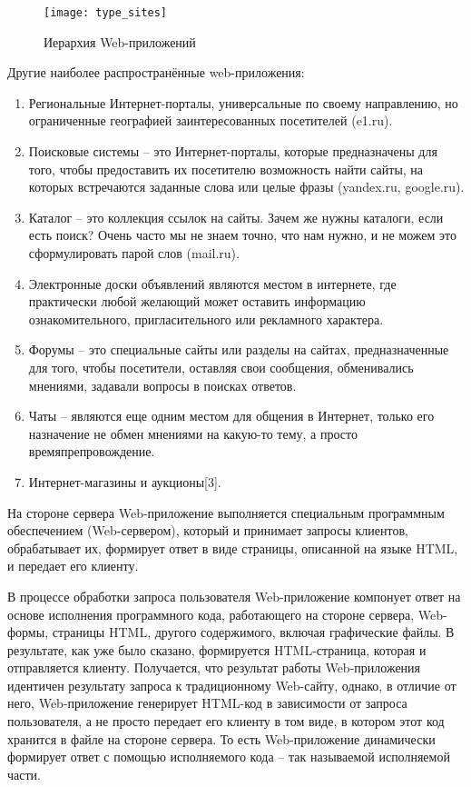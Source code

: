 \begin{figure}[h]
\center\texttt{[image: type\_sites]}
\caption{Иерархия Web-приложений}\label{type_sites}
\end{figure}

Другие наиболее распространённые web-приложения:
\begin{enumerate}
\item Региональные Интернет-порталы, универсальные по своему направлению, но ограниченные географией заинтересованных посетителей (e1.ru).
\item Поисковые системы -- это Интернет-порталы, которые предназначены для того, чтобы предоставить их посетителю возможность найти сайты, на которых встречаются заданные слова или целые фразы (yandex.ru, google.ru).
\item Каталог -- это коллекция ссылок на сайты. Зачем же нужны каталоги, если есть поиск? Очень часто мы не знаем точно, что нам нужно, и не можем это сформулировать парой слов (mail.ru).
\item Электронные доски объявлений  являются местом в интернете, где практически любой желающий может оставить информацию ознакомительного, пригласительного или рекламного характера.
\item Форумы -- это специальные сайты или разделы на сайтах, предназначенные для того, чтобы посетители, оставляя свои сообщения, обменивались мнениями, задавали вопросы в поисках ответов.
\item Чаты -- являются еще одним местом для общения в Интернет, только его назначение не обмен мнениями на какую-то тему, а просто времяпрепровождение.
\item Интернет-магазины и аукционы[3].
\end{enumerate}



На стороне сервера Web-приложение выполняется специальным программным обеспечением (Web-сервером), который и принимает запросы клиентов, обрабатывает их, формирует ответ в виде страницы, описанной на языке HTML, и передает его клиенту.

В процессе обработки запроса пользователя Web-приложение компонует ответ на основе исполнения программного кода, работающего на стороне сервера, Web-формы, страницы HTML, другого содержимого, включая графические файлы. В результате, как уже было сказано, формируется HTML-страница, которая и отправляется клиенту. Получается, что результат работы Web-приложения идентичен результату запроса к традиционному Web-сайту, однако, в отличие от него, Web-приложение генерирует HTML-код в зависимости от запроса пользователя, а не просто передает его клиенту в том виде, в котором этот код хранится в файле на стороне сервера. То есть Web-приложение динамически формирует ответ с помощью исполняемого кода -- так называемой исполняемой части.

